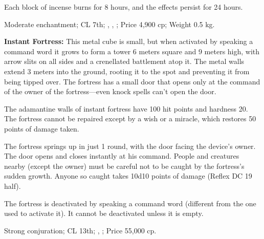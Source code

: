 Each block of incense burns for 8 hours, and the effects persist for 24 hours.

Moderate enchantment; CL 7th; , , ; Price 4,900 cp; Weight 0.5 kg.



\textbf{Instant Fortress:} This metal cube is small, but when activated by speaking a command word it grows to form a tower 6 meters square and 9 meters high, with arrow slits on all sides and a crenellated battlement atop it. The metal walls extend 3 meters into the ground, rooting it to the spot and preventing it from being tipped over. The fortress has a small door that opens only at the command of the owner of the fortress---even knock spells can't open the door.

The adamantine walls of instant fortress have 100 hit points and hardness 20. The fortress cannot be repaired except by a wish or a miracle, which restores 50 points of damage taken.

The fortress springs up in just 1 round, with the door facing the device's owner. The door opens and closes instantly at his command. People and creatures nearby (except the owner) must be careful not to be caught by the fortress's sudden growth. Anyone so caught takes 10d10 points of damage (Reflex DC 19 half).

The fortress is deactivated by speaking a command word (different from the one used to activate it). It cannot be deactivated unless it is empty.

Strong conjuration; CL 13th; , ; Price 55,000 cp.


